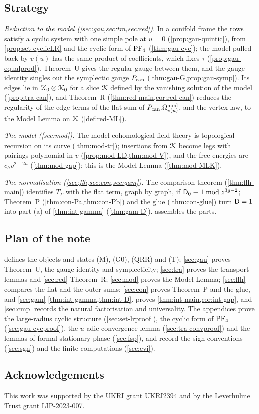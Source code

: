 \subsection{Strategy}
\label{sec:int-strategy}

\emph{Reduction to the model (\cref{sec:gau,sec:tra,sec:red}).} In a conifold frame the rows satisfy a cyclic system with one simple pole at $u=0$ (\cref{prop:gau-quintic}), from \cref{prop:set-cyclicLR} and the cyclic form of $\mathrm{PF}_{4}$ (\cref{thm:gau-cyc}); the model pulled back by $v(u)$ has the same product of coefficients, which fixes $\tau$ (\cref{prop:gau-equalprod}). Theorem~U gives the regular gauge between them, and the gauge identity singles out the symplectic gauge $P_{\mathrm{can}}$ (\cref{thm:gau-G,prop:gau-symp}). Its edges lie in $\mathcal{K}_{0}\otimes\mathcal{K}_{0}$ for a slice $\mathcal{K}$ defined by the vanishing solution of the model (\cref{prop:tra-can}), and Theorem~R (\cref{thm:red-main,cor:red-can}) reduces the regularity of the edge terms of the flat sum of $P_{\mathrm{can}}.\Omega^{\mathrm{mod}}_{v(u)}$, and the vertex law, to the Model Lemma on $\mathcal{K}$ (\cref{def:red-ML}).

\emph{The model (\cref{sec:mod}).} The model cohomological field theory is topological recursion on its curve (\cref{thm:mod-tr}); insertions from $\mathcal{K}$ become legs with pairings polynomial in $v$ (\cref{prop:mod-LD,thm:mod-V}), and the free energies are $c_hv^{2-2h}$ (\cref{thm:mod-gap}); this is the Model Lemma (\cref{thm:mod-MLK}).

\emph{The normalisation (\cref{sec:flh,sec:con,sec:gam}).} The comparison theorem (\cref{thm:flh-main}) identifies $T_\Gamma$ with the flat term, graph by graph, if $\mathsf{D}_0\equiv1\bmod z^{3g-2}$; Theorem~P (\cref{thm:con-Pa,thm:con-Pb}) and the glue (\cref{thm:con-glue}) turn $\mathsf{D}=1$ into part (a) of \cref{thm:int-gamma} (\cref{thm:gam-D}).  assembles the parts.

\subsection{Plan of the note}
\label{sec:int-plan}

 defines the objects and states (M), (G0), (QRR) and (T); \cref{sec:gau} proves Theorem~U, the gauge identity and symplecticity; \cref{sec:tra} proves the transport lemmas and \cref{sec:red} Theorem~R; \cref{sec:mod} proves the Model Lemma; \cref{sec:flh} compares the flat and the outer sums; \cref{sec:con} proves Theorem~P and the glue, and \cref{sec:gam} \cref{thm:int-gamma,thm:int-D}.  proves \cref{thm:int-main,cor:int-gap}, and \cref{sec:cmp} records the natural factorisation and universality. The appendices prove the large-radius cyclic structure (\cref{sec:set-lrproof}), the cyclic form of $\mathrm{PF}_{4}$ (\cref{sec:gau-cycproof}), the $u$-adic convergence lemma (\cref{sec:tra-convproof}) and the lemmas of formal stationary phase (\cref{sec:fsp}), and record the sign conventions (\cref{sec:sgn}) and the finite computations (\cref{sec:evi}).


\subsection*{Acknowledgements}

This work was supported by the UKRI grant UKRI2394 and by the Leverhulme Trust grant LIP-2023-007.
